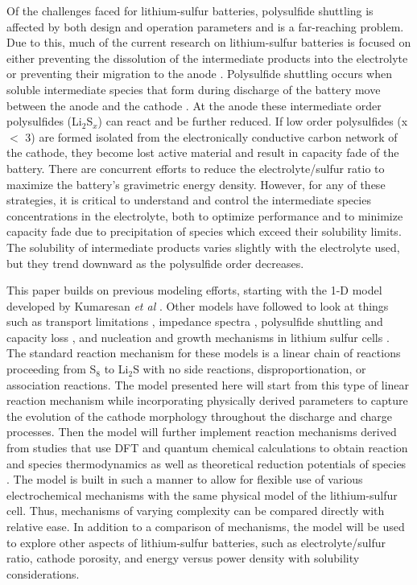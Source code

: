 \documentclass{elsarticle}
\begin{document}
Of the challenges faced for lithium-sulfur batteries, polysulfide shuttling is affected by both design and operation parameters and is a far-reaching problem. Due to this, much of the current research on lithium-sulfur batteries is focused on either preventing the dissolution of the intermediate products into the electrolyte or preventing their migration to the anode \cite{CHEN20201605, liu2016, cheng2019, pang2015}. Polysulfide shuttling occurs when soluble intermediate species that form during discharge of the battery move between the anode and the cathode \cite{C5EE01388G}. At the anode these intermediate order polysulfides (Li$_2$S$_x$) can react and be further reduced. If low order polysulfides (x $<$ 3) are formed isolated from the electronically conductive carbon network of the cathode, they become lost active material and result in capacity fade of the battery. There are concurrent efforts to reduce the electrolyte/sulfur ratio to maximize the battery’s gravimetric energy density. However, for any of these strategies, it is critical to understand and control the intermediate species concentrations in the electrolyte, both to optimize performance and to minimize capacity fade due to precipitation of species which exceed their solubility limits. The solubility of intermediate products varies slightly with the electrolyte used, but they trend downward as the polysulfide order decreases.

This paper builds on previous modeling efforts, starting with the 1-D model developed by Kumaresan \textit{et al} \cite{Kumaresan_2008}. Other models have followed to look at things such as transport limitations \cite{ZHANG2016502}, impedance spectra \cite{FRONCZEK2013183}, polysulfide shuttling and capacity loss \cite{HOFMANN2014300}, and nucleation and growth mechanisms in lithium sulfur cells \cite{REN2016115}. The standard reaction mechanism for these models is a linear chain of reactions proceeding from S$_8$ to Li$_2$S with no side reactions, disproportionation, or association reactions. The model presented here will start from this type of linear reaction mechanism while incorporating physically derived parameters to capture the evolution of the cathode morphology throughout the discharge and charge processes. Then the model will further implement reaction mechanisms derived from studies that use DFT and quantum chemical calculations to obtain reaction and species thermodynamics as well as theoretical reduction potentials of species \cite{assary2014, kuzmina2019}. The model is built in such a manner to allow for flexible use of various electrochemical mechanisms with the same physical model of the lithium-sulfur cell. Thus, mechanisms of varying complexity can be compared directly with relative ease. In addition to a comparison of mechanisms, the model will be used to explore other aspects of lithium-sulfur batteries, such as electrolyte/sulfur ratio, cathode porosity, and energy versus power density with solubility considerations.
\end{document}
